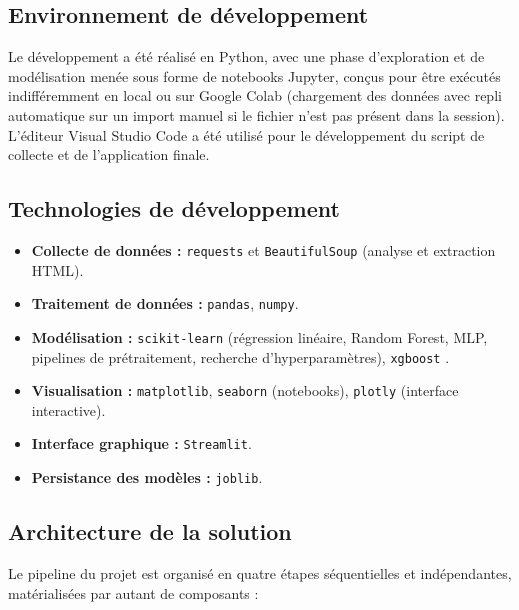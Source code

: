 \subsection{Environnement de développement}

Le développement a été réalisé en Python, avec une phase d'exploration et de modélisation
menée sous forme de notebooks Jupyter, conçus pour être exécutés indifféremment en local ou sur
Google Colab (chargement des données avec repli automatique sur un import manuel si le fichier
n'est pas présent dans la session). L'éditeur Visual Studio Code a été utilisé pour le
développement du script de collecte et de l'application finale.

\subsection{Technologies de développement}

\begin{itemize}
  \item \textbf{Collecte de données :} \texttt{requests} et \texttt{BeautifulSoup} (analyse et
  extraction HTML).
  \item \textbf{Traitement de données :} \texttt{pandas}, \texttt{numpy}.
  \item \textbf{Modélisation :} \texttt{scikit-learn} \citep{pedregosa2011scikitlearn}
  (régression linéaire, Random Forest, MLP, pipelines de prétraitement, recherche
  d'hyperparamètres), \texttt{xgboost} \citep{chen2016xgboost}.
  \item \textbf{Visualisation :} \texttt{matplotlib}, \texttt{seaborn} (notebooks),
  \texttt{plotly} (interface interactive).
  \item \textbf{Interface graphique :} \texttt{Streamlit}.
  \item \textbf{Persistance des modèles :} \texttt{joblib}.
\end{itemize}

\subsection{Architecture de la solution}

Le pipeline du projet est organisé en quatre étapes séquentielles et indépendantes,
matérialisées par autant de composants :

